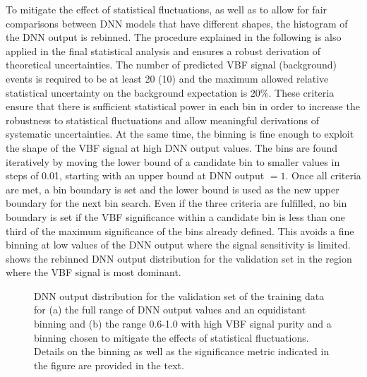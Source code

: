 To mitigate the effect of statistical fluctuations, as well as to allow for fair comparisons between DNN models that have different shapes, the histogram of the DNN output is rebinned. The procedure explained in the following is also applied in the final statistical analysis and ensures a robust derivation of theoretical uncertainties.
The number of predicted VBF signal (background) events is required to be at least 20 (10) and the maximum allowed relative statistical uncertainty on the background expectation is 20\%.
These criteria ensure that there is sufficient statistical power in each bin in order to increase the robustness to statistical fluctuations and allow meaningful derivations of systematic uncertainties. At the same time, the binning is fine enough to exploit the shape of the VBF signal at high DNN output values.
The bins are found iteratively by moving the lower bound of a candidate bin to smaller values in steps of 0.01, starting with an upper bound at DNN output $= 1$. Once all criteria are met, a bin boundary is set and the lower bound is used as the new upper boundary for the next bin search. Even if the three criteria are fulfilled, no bin boundary is set if the VBF significance within a candidate bin is less than one third of the maximum significance of the bins already defined. This avoids a fine binning at low values of the DNN output where the signal sensitivity is limited.
 shows the rebinned DNN output distribution for the validation set in the region where the VBF signal is most dominant.

\begin{figure}[t]
    \caption[DNN output distributions for the validation set of the training data.]{DNN output distribution for the validation set of the training data for (a) the full range of DNN output values and an equidistant binning and (b) the range 0.6-1.0 with high VBF signal purity and a binning chosen to mitigate the effects of statistical fluctuations. Details on the binning as well as the significance metric indicated in the figure are provided in the text.}
    \label{fig:dnn-val-set}
\end{figure}

